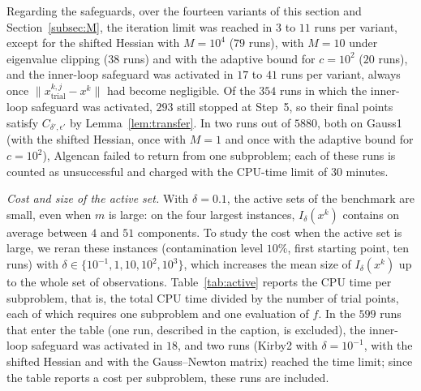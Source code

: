 \documentclass[11pt]{article}
\begin{document}
Regarding the safeguards, over the fourteen variants of this section and
Section~\ref{subsec:M}, the iteration limit was reached in $3$ to $11$ runs per
variant, except for the shifted Hessian with $M=10^4$ ($79$ runs), with $M=10$
under eigenvalue clipping ($38$ runs) and with the adaptive bound for
$c = 10^2$ ($20$ runs), and the inner-loop safeguard was activated in $17$ to
$41$ runs per variant, always once $\|x^{k,j}_{\mathrm{trial}} - x^k\|$ had
become negligible. Of the $354$ runs in which the inner-loop safeguard was
activated, $293$ still stopped at Step~5, so their final points satisfy
$C_{\delta',\epsilon'}$ by Lemma~\ref{lem:transfer}. In two runs out of $5880$, both on Gauss1 (with the shifted
Hessian, once with $M=1$ and once with the adaptive bound for $c = 10^2$),
Algencan failed to return from one subproblem; each of these runs is counted as
unsuccessful and charged with the CPU-time limit of $30$ minutes.


\emph{Cost and size of the active set.} With $\delta = 0.1$, the active sets
of the benchmark are small, even when $m$ is large: on the four largest
instances, $I_\delta(x^k)$ contains on average between $4$ and $51$
components. To study the cost when the active set is large, we reran these
instances (contamination level $10\%$, first starting point, ten runs) with
$\delta \in \{10^{-1}, 1, 10, 10^2, 10^3\}$, which increases the mean size of
$I_\delta(x^k)$ up to the whole set of observations. Table~\ref{tab:active}
reports the CPU time per subproblem, that is, the total CPU time divided by the
number of trial points, each of which requires one subproblem and one
evaluation of $f$. In the $599$ runs that enter the table (one run, described
in the caption, is excluded), the inner-loop safeguard was activated in $18$,
and two runs (Kirby2 with $\delta = 10^{-1}$, with the shifted Hessian and with
the Gauss--Newton matrix) reached the time limit; since the table reports a
cost per subproblem, these runs are included.
\end{document}
